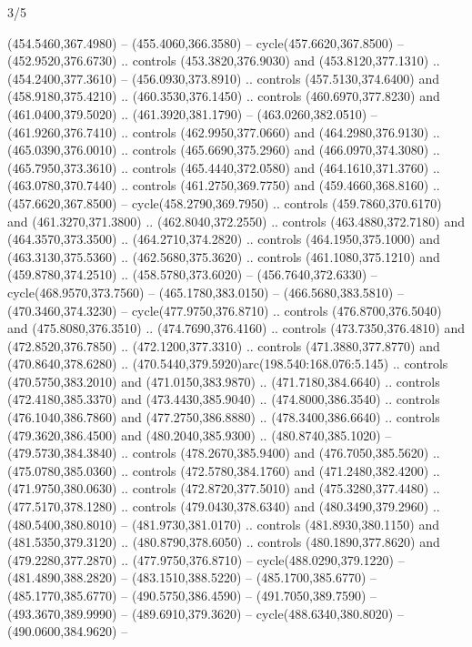 \begin{flagdescription}{3/5}
\begin{scope}[xshift=0.5\flaglength,yshift=0.5\flagwidth,scale=\flagwidth/768]
\begin{scope}[y=0.80pt, x=0.80pt, yscale=-1.75, xscale=1.75,xshift=-74mm,yshift=-108mm]
\begin{scope}[shift={(-236.93803,83.83961)},fill=cc8a400]
  (454.5460,367.4980) -- (455.4060,366.3580) -- cycle(457.6620,367.8500) --
  (452.9520,376.6730) .. controls (453.3820,376.9030) and (453.8120,377.1310) ..
  (454.2400,377.3610) -- (456.0930,373.8910) .. controls (457.5130,374.6400) and
  (458.9180,375.4210) .. (460.3530,376.1450) .. controls (460.6970,377.8230) and
  (461.0400,379.5020) .. (461.3920,381.1790) -- (463.0260,382.0510) --
  (461.9260,376.7410) .. controls (462.9950,377.0660) and (464.2980,376.9130) ..
  (465.0390,376.0010) .. controls (465.6690,375.2960) and (466.0970,374.3080) ..
  (465.7950,373.3610) .. controls (465.4440,372.0580) and (464.1610,371.3760) ..
  (463.0780,370.7440) .. controls (461.2750,369.7750) and (459.4660,368.8160) ..
  (457.6620,367.8500) -- cycle(458.2790,369.7950) .. controls
  (459.7860,370.6170) and (461.3270,371.3800) .. (462.8040,372.2550) .. controls
  (463.4880,372.7180) and (464.3570,373.3500) .. (464.2710,374.2820) .. controls
  (464.1950,375.1000) and (463.3130,375.5360) .. (462.5680,375.3620) .. controls
  (461.1080,375.1210) and (459.8780,374.2510) .. (458.5780,373.6020) --
  (456.7640,372.6330) -- cycle(468.9570,373.7560) -- (465.1780,383.0150) --
  (466.5680,383.5810) -- (470.3460,374.3230) -- cycle(477.9750,376.8710) ..
  controls (476.8700,376.5040) and (475.8080,376.3510) .. (474.7690,376.4160) ..
  controls (473.7350,376.4810) and (472.8520,376.7850) .. (472.1200,377.3310) ..
  controls (471.3880,377.8770) and (470.8640,378.6280) ..
  (470.5440,379.5920)arc(198.540:168.076:5.145) .. controls (470.5750,383.2010)
  and (471.0150,383.9870) .. (471.7180,384.6640) .. controls (472.4180,385.3370)
  and (473.4430,385.9040) .. (474.8000,386.3540) .. controls (476.1040,386.7860)
  and (477.2750,386.8880) .. (478.3400,386.6640) .. controls (479.3620,386.4500)
  and (480.2040,385.9300) .. (480.8740,385.1020) -- (479.5730,384.3840) ..
  controls (478.2670,385.9400) and (476.7050,385.5620) .. (475.0780,385.0360) ..
  controls (472.5780,384.1760) and (471.2480,382.4200) .. (471.9750,380.0630) ..
  controls (472.8720,377.5010) and (475.3280,377.4480) .. (477.5170,378.1280) ..
  controls (479.0430,378.6340) and (480.3490,379.2960) .. (480.5400,380.8010) --
  (481.9730,381.0170) .. controls (481.8930,380.1150) and (481.5350,379.3120) ..
  (480.8790,378.6050) .. controls (480.1890,377.8620) and (479.2280,377.2870) ..
  (477.9750,376.8710) -- cycle(488.0290,379.1220) -- (481.4890,388.2820) --
  (483.1510,388.5220) -- (485.1700,385.6770) -- (485.1770,385.6770) --
  (490.5750,386.4590) -- (491.7050,389.7590) -- (493.3670,389.9990) --
  (489.6910,379.3620) -- cycle(488.6340,380.8020) -- (490.0600,384.9620) --

\end{scope}
\end{scope}
\end{scope}
\end{flagdescription}
